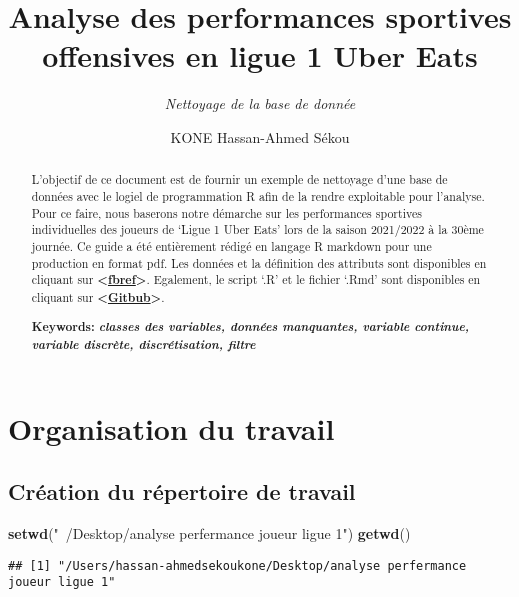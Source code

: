 \documentclass[7pt,]{report}
\title{\textbf{Analyse des performances sportives offensives en ligue 1 Uber Eats}}
\subtitle{\emph{Nettoyage de la base de donnée}}
\author{KONE Hassan-Ahmed Sékou}
\date{}
\newenvironment{Shaded}{\begin{snugshade}}{\end{snugshade}}
\newcommand{\KeywordTok}[1]{\textcolor[rgb]{0.13,0.29,0.53}{\textbf{#1}}}
\newcommand{\NormalTok}[1]{#1}
\newcommand{\StringTok}[1]{\textcolor[rgb]{0.31,0.60,0.02}{#1}}
\begin{document}
\maketitle
\begin{abstract}
L'objectif de ce document est de fournir un exemple de nettoyage d'une base de données avec le logiel de programmation R afin de la rendre exploitable pour l'analyse. Pour ce faire, nous baserons notre démarche sur les performances sportives individuelles des joueurs de `Ligue 1 Uber Eats' lors de la saison 2021/2022 à la 30ème journée. Ce guide a été entièrement rédigé en langage R markdown pour une production en format pdf. Les données et la définition des attributs sont disponibles en cliquant sur \textbf{\textless{}\href{https://fbref.com/fr/?lang=fr}{fbref}\textgreater{}}. Egalement, le script `.R' et le fichier `.Rmd' sont disponibles en cliquant sur \textbf{\textless{}\href{https://github.com/konehassan92/performances_offensives_L1_nettoyage_bdd}{Gitbub}\textgreater{}}.

\par

\textbf{Keywords:} \textbf{\emph{classes des variables, données manquantes, variable continue, variable discrète, discrétisation, filtre}}~
\end{abstract}

{
\setcounter{tocdepth}{4}
\tableofcontents
}
\hypertarget{organisation-du-travail}{%
\chapter{Organisation du travail}\label{organisation-du-travail}}

\hypertarget{cruxe9ation-du-ruxe9pertoire-de-travail}{%
\section{Création du répertoire de travail}\label{cruxe9ation-du-ruxe9pertoire-de-travail}}

\begin{Shaded}
\begin{Highlighting}[]
\KeywordTok{setwd}\NormalTok{(}\StringTok{"~/Desktop/analyse perfermance joueur ligue 1"}\NormalTok{)}
\KeywordTok{getwd}\NormalTok{()}
\end{Highlighting}
\end{Shaded}

\begin{verbatim}
## [1] "/Users/hassan-ahmedsekoukone/Desktop/analyse perfermance joueur ligue 1"
\end{verbatim}
\end{document}
